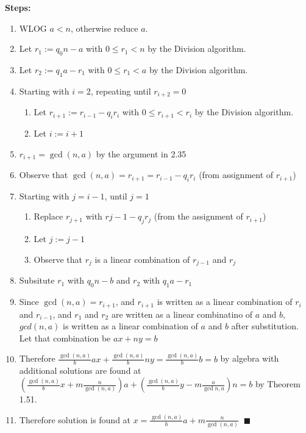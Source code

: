 \textbf{Steps: } \\
\begin{enumerate}
\item WLOG \(a < n\), otherwise reduce \(a\).
\item Let \(r_1 := q_0 n - a\) with \(0 \leq r_1 < n\) by the Division algorithm.
\item Let \(r_2 := q_1 a - r_1\) with \(0 \leq r_1 < a\) by the Division algorithm.
\item Starting with \(i = 2\), repeating until \(r_{i+2} = 0\)
\begin{enumerate}
\item Let \(r_{i+1} := r_{i-1} - q_i r_i\) with \(0 \leq r_{i+1} < r_i\) by the Division algorithm.
\item Let \(i := i + 1\)
\end{enumerate}
\item \(r_{i+1} = \gcd(n, a)\) by the argument in 2.35
\item Observe that \(\gcd(n, a)= r_{i+1} = r_{i-1} - q_i r_i\) (from assignment of \(r_{i+1}\))
\item Starting with \(j = i - 1\), until \(j = 1\)
\begin{enumerate}
\item Replace \(r_{j + 1}\) with \(r{j-1} - q_j r_j\) (from the assignment of \(r_{i+1}\))
\item Let \(j := j - 1\)
\item Observe that \(r_{j}\) is a linear combination of \(r_{j-1}\) and \(r_j\)
\end{enumerate}
\item Subsitute \(r_1\) with \(q_0 n - b\) and \(r_2\) with \(q_1 a - r_1\)
\item Since \(\gcd(n, a) = r_{i+1}\), and \(r_{i+1}\) is written as a linear combination of \(r_i\) and \(r_{i-1}\), and \(r_1\) and \(r_2\) are written as a linear combinatino of \(a\) and \(b\), \(gcd(n, a)\) is written as a linear combination of \(a\) and \(b\) after substitution. Let that combination be \(ax + ny = b\)
\item Therefore \(\frac{\gcd(n, a)}{b} ax + \frac{\gcd(n, a)}{b} ny = \frac{\gcd(n, a)}{b} b = b\) by algebra with additional solutions are found at \((\frac{\gcd(n, a)}{b} x + m\frac{n}{\gcd(n, a)})a + (\frac{\gcd(n, a)}{b} y - m\frac{a}{\gcd{n, a}})n = b\) by Theorem 1.51.
\item Therefore solution is found at \(x = \frac{\gcd(n, a)}{b} a + m\frac{n}{\gcd(n, a)}\)
\tiny {$~\blacksquare$}
\end{enumerate}

